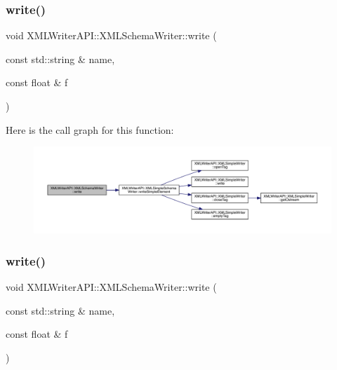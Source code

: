 \subsubsection{\texorpdfstring{write()}{write()}\hspace{0.1cm}{\footnotesize\ttfamily [5/10]}}
{\footnotesize\ttfamily void X\+M\+L\+Writer\+A\+P\+I\+::\+X\+M\+L\+Schema\+Writer\+::write (\begin{DoxyParamCaption}\item[{const std\+::string \&}]{name,  }\item[{const float \&}]{f }\end{DoxyParamCaption})\hspace{0.3cm}{\ttfamily [inline]}}

Here is the call graph for this function\+:
\nopagebreak
\begin{figure}[H]
\begin{center}
\leavevmode
\includegraphics[width=350pt]{db/d34/classXMLWriterAPI_1_1XMLSchemaWriter_affbcfbac63240a8048b6b0940cc05c30_cgraph}
\end{center}
\end{figure}
\mbox{\label{classXMLWriterAPI_1_1XMLSchemaWriter_affbcfbac63240a8048b6b0940cc05c30}} 
\subsubsection{\texorpdfstring{write()}{write()}\hspace{0.1cm}{\footnotesize\ttfamily [6/10]}}
{\footnotesize\ttfamily void X\+M\+L\+Writer\+A\+P\+I\+::\+X\+M\+L\+Schema\+Writer\+::write (\begin{DoxyParamCaption}\item[{const std\+::string \&}]{name,  }\item[{const float \&}]{f }\end{DoxyParamCaption})\hspace{0.3cm}{\ttfamily [inline]}}


